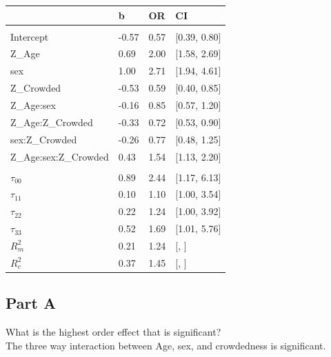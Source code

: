 \documentclass[]{article}
\begin{document}
\begin{table}[H]
\centering
\begin{tabular}{llll}
\toprule
 & b & OR & CI\\
\midrule
\addlinespace[0.3em]
\multicolumn{4}{l}{\textbf{Fixed}}\\
\hspace{1em}Intercept & -0.57 & 0.57 & [0.39, 0.80]\\
\hspace{1em}Z\_Age & 0.69 & 2.00 & [1.58, 2.69]\\
\hspace{1em}sex & 1.00 & 2.71 & [1.94, 4.61]\\
\hspace{1em}Z\_Crowded & -0.53 & 0.59 & [0.40, 0.85]\\
\hspace{1em}Z\_Age:sex & -0.16 & 0.85 & [0.57, 1.20]\\
\hspace{1em}Z\_Age:Z\_Crowded & -0.33 & 0.72 & [0.53, 0.90]\\
\hspace{1em}sex:Z\_Crowded & -0.26 & 0.77 & [0.48, 1.25]\\
\hspace{1em}Z\_Age:sex:Z\_Crowded & 0.43 & 1.54 & [1.13, 2.20]\\
\addlinespace[0.3em]
\multicolumn{4}{l}{\textbf{Random}}\\
\hspace{1em}$\tau_{00}$ & 0.89 & 2.44 & [1.17, 6.13]\\
\hspace{1em}$\tau_{11}$ & 0.10 & 1.10 & [1.00, 3.54]\\
\hspace{1em}$\tau_{22}$ & 0.22 & 1.24 & [1.00, 3.92]\\
\hspace{1em}$\tau_{33}$ & 0.52 & 1.69 & [1.01, 5.76]\\
$R^2_m$ & 0.21 & 1.24 & [, ]\\
$R^2_c$ & 0.37 & 1.45 & [, ]\\
\bottomrule
\end{tabular}
\end{table}

\subsection{Part A}\label{part-a-2}

What is the highest order effect that is significant?\\
The three way interaction between Age, sex, and crowdedness is
significant.
\end{document}
